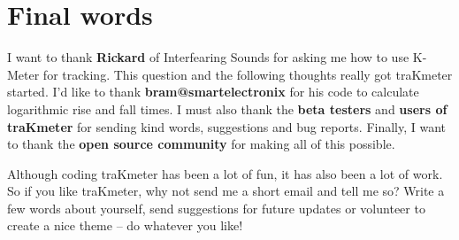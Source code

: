 






\chapter{Final words}
\label{chap:final_words}

I want to thank \textbf{Rickard} of Interfearing Sounds for asking me
how to use K-Meter for tracking.  This question and the following
thoughts really got traKmeter started.  I'd like to thank
\textbf{bram@smartelectronix} for his code to calculate logarithmic
rise and fall times.  I must also thank the \textbf{beta testers} and
\textbf{users of traKmeter} for sending kind words, suggestions and
bug reports.  Finally, I want to thank the \textbf{open source
  community} for making all of this possible.

Although coding traKmeter has been a lot of fun, it has also been a
lot of work.  So if you like traKmeter, why not send me a short email
and tell me so?  Write a few words about yourself, send suggestions
for future updates or volunteer to create a nice theme -- do whatever
you like!


